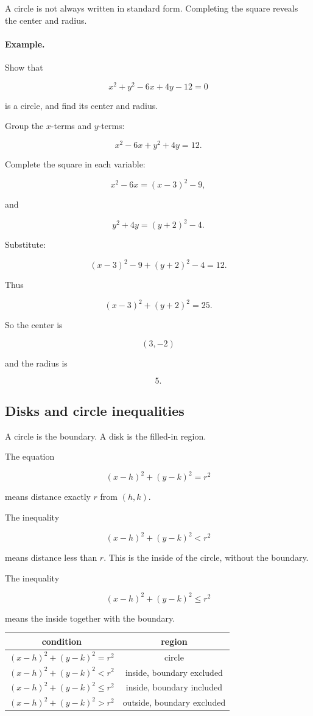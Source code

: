 A circle is not always written in standard form.  Completing the square reveals the
center and radius.

\paragraph{Example.}
Show that

\[
x^2+y^2-6x+4y-12=0
\]

is a circle, and find its center and radius.

Group the \(x\)-terms and \(y\)-terms:

\[
x^2-6x+y^2+4y=12.
\]

Complete the square in each variable:

\[
x^2-6x=(x-3)^2-9,
\]

and

\[
y^2+4y=(y+2)^2-4.
\]

Substitute:

\[
(x-3)^2-9+(y+2)^2-4=12.
\]

Thus

\[
(x-3)^2+(y+2)^2=25.
\]

So the center is

\[
\boxed{(3,-2)}
\]

and the radius is

\[
\boxed{5}.
\]

\subsection{Disks and circle inequalities}
\label{appsubsec:circle-inequalities}

A circle is the boundary.  A disk is the filled-in region.

The equation

\[
(x-h)^2+(y-k)^2=r^2
\]

means distance exactly \(r\) from \((h,k)\).

The inequality

\[
(x-h)^2+(y-k)^2<r^2
\]

means distance less than \(r\).  This is the inside of the circle, without the boundary.

The inequality

\[
(x-h)^2+(y-k)^2\le r^2
\]

means the inside together with the boundary.

\begin{center}
\renewcommand{\arraystretch}{1.5}
\begin{tabular}{c|c}
\textbf{condition} & \textbf{region} \\ \hline
\((x-h)^2+(y-k)^2=r^2\) & circle \\
\((x-h)^2+(y-k)^2<r^2\) & inside, boundary excluded \\
\((x-h)^2+(y-k)^2\le r^2\) & inside, boundary included \\
\((x-h)^2+(y-k)^2>r^2\) & outside, boundary excluded
\end{tabular}
\end{center}


